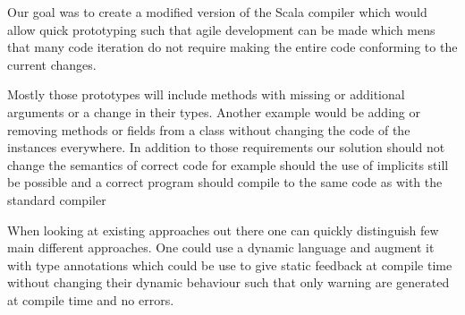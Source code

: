
Our goal was to create a modified version of the Scala compiler which would allow quick prototyping such that agile development can be made which mens that many code iteration do not require making the entire code conforming to the current changes.

Mostly those prototypes will include methods with missing or additional arguments or a change in their types. Another example would be adding or removing methods or fields from a class without changing the code of the instances everywhere.
In addition to those requirements our solution should not change the semantics of correct code for example should the use of implicits still be possible and a correct program should compile to the same code as with the standard compiler

When looking at existing approaches out there one can quickly distinguish few main different approaches. One could use a dynamic language and augment it with type annotations which could be use to give static feedback at compile time without changing their dynamic behaviour such that only warning are generated at compile time and no errors.

